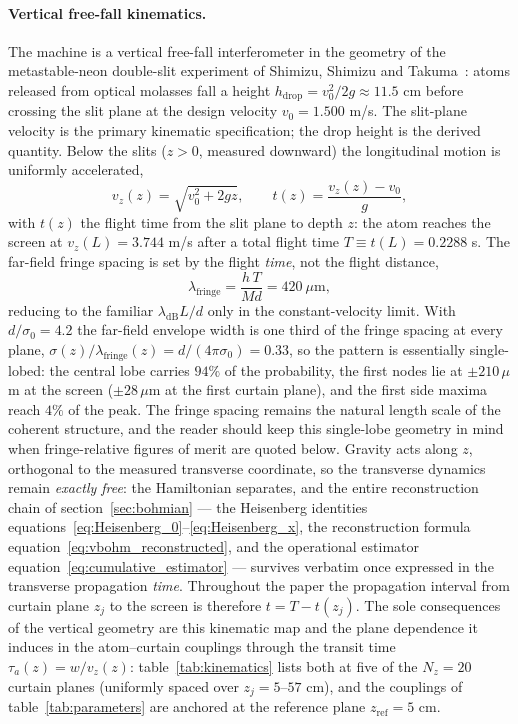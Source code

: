 \documentclass[11pt,a4paper]{article}
\begin{document}
\paragraph{Vertical free-fall kinematics.} The machine is a vertical free-fall interferometer in the geometry of the metastable-neon double-slit experiment of Shimizu, Shimizu and Takuma~\cite{Shimizu1992}: atoms released from optical molasses fall a height $h_\text{drop} = v_0^2/2g \approx 11.5$ cm before crossing the slit plane at the design velocity $v_0 = 1.500$ m/s. The slit-plane velocity is the primary kinematic specification; the drop height is the derived quantity. Below the slits ($z > 0$, measured downward) the longitudinal motion is uniformly accelerated,
\begin{equation}
v_z(z) = \sqrt{v_0^2 + 2gz},
\qquad
t(z) = \frac{v_z(z) - v_0}{g},
\label{eq:kinematics_map}
\end{equation}
with $t(z)$ the flight time from the slit plane to depth $z$: the atom reaches the screen at $v_z(L) = 3.744$ m/s after a total flight time $T \equiv t(L) = 0.2288$ s. The far-field fringe spacing is set by the flight \emph{time}, not the flight distance,
\begin{equation}
\lambda_\text{fringe} = \frac{h\,T}{M d} = 420~\mu\text{m},
\label{eq:fringe_accel}
\end{equation}
reducing to the familiar $\lambda_\text{dB}L/d$ only in the constant-velocity limit. With $d/\sigma_0 = 4.2$ the far-field envelope width is one third of the fringe spacing at every plane, $\sigma(z)/\lambda_\text{fringe}(z) = d/(4\pi\sigma_0) = 0.33$, so the pattern is essentially single-lobed: the central lobe carries $94\%$ of the probability, the first nodes lie at $\pm 210\,\mu$m at the screen ($\pm 28\,\mu$m at the first curtain plane), and the first side maxima reach $4\%$ of the peak. The fringe spacing remains the natural length scale of the coherent structure, and the reader should keep this single-lobe geometry in mind when fringe-relative figures of merit are quoted below. Gravity acts along $z$, orthogonal to the measured transverse coordinate, so the transverse dynamics remain \emph{exactly free}: the Hamiltonian separates, and the entire reconstruction chain of section~\ref{sec:bohmian} --- the Heisenberg identities equations~\eqref{eq:Heisenberg_0}--\eqref{eq:Heisenberg_x}, the reconstruction formula equation~\eqref{eq:vbohm_reconstructed}, and the operational estimator equation~\eqref{eq:cumulative_estimator} --- survives verbatim once expressed in the transverse propagation \emph{time}. Throughout the paper the propagation interval from curtain plane $z_j$ to the screen is therefore $t = T - t(z_j)$. The sole consequences of the vertical geometry are this kinematic map and the plane dependence it induces in the atom--curtain couplings through the transit time $\tau_a(z) = w/v_z(z)$: table~\ref{tab:kinematics} lists both at five of the $N_z = 20$ curtain planes (uniformly spaced over $z_j = 5$--$57$ cm), and the couplings of table~\ref{tab:parameters} are anchored at the reference plane $z_\text{ref} = 5$ cm.
\end{document}

